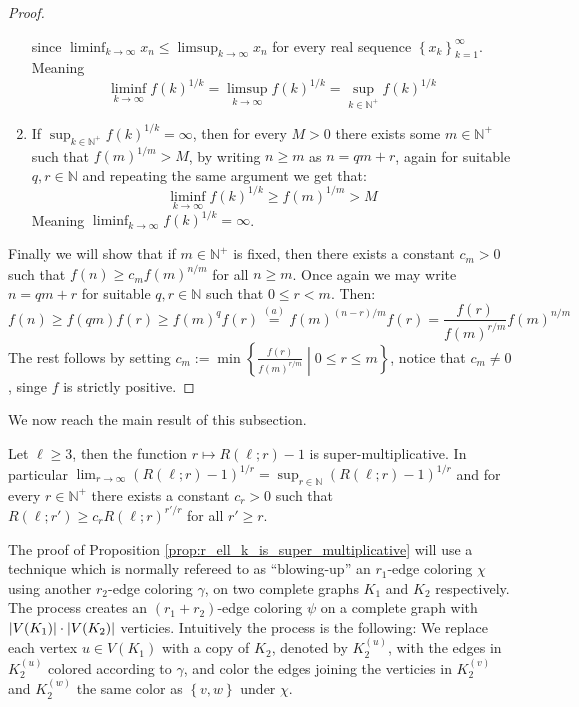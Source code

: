 \begin{proof}
\begin{enumerate}
\begin{equation*}
		      \end{equation*}
		      since $\liminf_{k \to \infty} x_{n} \leq \limsup_{k \to \infty} x_{n}$ for every real sequence $\left\{x_k\right\}_{k = 1}^{\infty}$. Meaning
		      \begin{equation*}
			      \liminf_{k\to \infty} f(k)^{1/k} = \limsup_{k \to \infty} f(k)^{1/k} = \sup_{k \in \mathbb{N}^+} f(k)^{1/k}
		      \end{equation*}
		\item If $\sup_{k \in \mathbb{N}^{+}} f(k)^{1/k} = \infty$, then for every $M > 0$ there exists some $m \in \mathbb{N}^{+}$ such that $f(m)^{1/m} > M$, by writing $n \geq m$ as $n = qm + r$, again for suitable $q, r \in \mathbb{N}$ and repeating the same argument we get that:
		      \begin{equation*}
			      \liminf_{k \to \infty} f(k)^{1/k} \geq f(m)^{1/m} > M
		      \end{equation*}
		      Meaning $\liminf_{k \to \infty} f(k)^{1/k} = \infty$.
	\end{enumerate}
	Finally we will show that if $m \in \mathbb{N}^{+}$ is fixed, then there exists a constant $c_m > 0$ such that $f(n) \geq c_{m} f(m)^{n / m}$ for all $n \geq m$. Once again we may write $n = qm + r$ for suitable $q, r \in \mathbb{N}$ such that $0 \leq r < m$. Then:
	\begin{equation*}
		f(n) \geq f(qm) f(r) \geq f(m)^q f(r) \stackrel{(a)}{=} f(m)^{(n - r) / m} f(r) = \frac{f(r)}{f(m)^{r / m}} f(m)^{n / m}
	\end{equation*}
	The rest follows by setting $c_m := \min \left\{\frac{f(r)}{f(m)^{r / m}} \middle| 0 \leq r \leq m\right\}$, notice that $c_m \neq 0$, singe $f$ is strictly positive.
\end{proof}

We now reach the main result of this subsection.
\begin{proposition}\label{prop:r_ell_k_is_super_multiplicative}
	Let $\ell \geq 3$, then the function $r \mapsto R(\ell; r) - 1$ is super-multiplicative. In particular $\lim_{r \to \infty} \left(R(\ell; r) - 1\right)^{1/r} = \sup_{r \in \mathbb{N}} (R(\ell; r) - 1)^{1 / r}$ and for every $r \in \mathbb{N}^{+}$ there exists a constant $c_r > 0$ such that $R(\ell; r') \geq c_r R(\ell; r)^{r' / r}$ for all $r' \geq r$.
\end{proposition}

The proof of Proposition \ref{prop:r_ell_k_is_super_multiplicative} will use a technique which is normally refereed to as ``blowing-up'' an $r_1$-edge coloring $\chi$ using another $r_2$-edge coloring $\gamma$, on two complete graphs $K_{1}$ and $K_{2}$ respectively. The process creates an $(r_1 + r_2)$-edge coloring $\psi$ on a complete graph with $\left\lvert V(K_1)\right\rvert \cdot \left\lvert V(K_{2})\right\rvert$ verticies.
Intuitively the process is the following:
We replace each vertex $u \in V(K_{1})$ with a copy of $K_{2}$, denoted by $K_{2}^{(u)}$, with the edges in $K_2^{(u)}$ colored according to $\gamma$, and color the edges joining the verticies in $K_2^{(v)}$ and $K_2^{(w)}$ the same color as $\left\{v, w\right\}$ under $\chi$.

